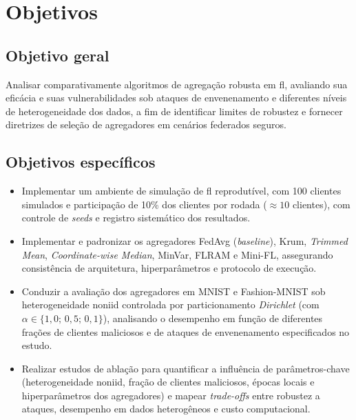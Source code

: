 \chapter{Objetivos}
\label{cap:objetivos}

\section{Objetivo geral}

Analisar comparativamente algoritmos de agregação robusta em \gls{fl}, avaliando sua eficácia e suas vulnerabilidades sob ataques de envenenamento e diferentes níveis de heterogeneidade dos dados, a fim de identificar limites de robustez e fornecer diretrizes de seleção de agregadores em cenários federados seguros.

\section{Objetivos específicos}

\begin{itemize}
    \item Implementar um ambiente de simulação de \gls{fl} reprodutível, com 100 clientes simulados e participação de 10\% dos clientes por rodada (\(\approx 10\) clientes), com controle de \emph{seeds} e registro sistemático dos resultados.

    \item Implementar e padronizar os agregadores FedAvg (\emph{baseline}), Krum, \emph{Trimmed Mean}, \emph{Coordinate-wise Median}, MinVar, FLRAM e Mini-FL, assegurando consistência de arquitetura, hiperparâmetros e protocolo de execução.

    \item Conduzir a avaliação dos agregadores em MNIST e Fashion-MNIST sob heterogeneidade \gls{noniid} controlada por particionamento \emph{Dirichlet} (com \(\alpha \in \{1{,}0;\,0{,}5;\,0{,}1\}\)), analisando o desempenho em função de diferentes frações de clientes maliciosos e de ataques de envenenamento especificados no estudo.

    \item Realizar estudos de ablação para quantificar a influência de parâmetros-chave (heterogeneidade \gls{noniid}, fração de clientes maliciosos, épocas locais e hiperparâmetros dos agregadores) e mapear \emph{trade-offs} entre robustez a ataques, desempenho em dados heterogêneos e custo computacional.
\end{itemize}

